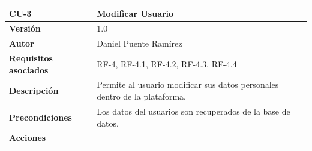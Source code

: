 \begin{longtable}[H]{@{}ll@{}}
\toprule
\begin{minipage}[b]{0.23\columnwidth}\raggedright\strut
\textbf{CU-3}\strut
\end{minipage} & \begin{minipage}[b]{0.71\columnwidth}\raggedright\strut
\textbf{Modificar Usuario}\strut
\end{minipage}\tabularnewline
\midrule
\endhead
\begin{minipage}[t]{0.23\columnwidth}\raggedright\strut
\textbf{Versión}\strut
\end{minipage} & \begin{minipage}[t]{0.71\columnwidth}\raggedright\strut
1.0\strut
\end{minipage}\tabularnewline
\begin{minipage}[t]{0.23\columnwidth}\raggedright\strut
\textbf{Autor}\strut
\end{minipage} & \begin{minipage}[t]{0.71\columnwidth}\raggedright\strut
Daniel Puente Ramírez\strut
\end{minipage}\tabularnewline
\begin{minipage}[t]{0.23\columnwidth}\raggedright\strut
\textbf{Requisitos asociados}\strut
\end{minipage} & \begin{minipage}[t]{0.71\columnwidth}\raggedright\strut
RF-4, RF-4.1, RF-4.2, RF-4.3, RF-4.4\strut
\end{minipage}\tabularnewline
\begin{minipage}[t]{0.23\columnwidth}\raggedright\strut
\textbf{Descripción}\strut
\end{minipage} & \begin{minipage}[t]{0.71\columnwidth}\raggedright\strut
Permite al usuario modificar sus datos personales dentro de la plataforma.\strut
\end{minipage}\tabularnewline
\begin{minipage}[t]{0.23\columnwidth}\raggedright\strut
\textbf{Precondiciones}\strut
\end{minipage} & \begin{minipage}[t]{0.71\columnwidth}\raggedright\strut
Los datos del usuarios son recuperados de la base de datos.\strut
\end{minipage}\tabularnewline
\begin{minipage}[t]{0.23\columnwidth}\raggedright\strut
\textbf{Acciones}\strut
\end{minipage} & \begin{minipage}[t]{0.71\columnwidth}\raggedright\strut

\end{minipage}
\end{longtable}
